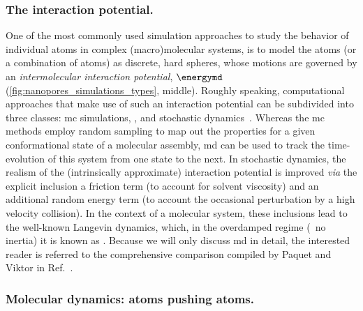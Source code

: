 \subsubsection{The interaction potential.}
%

One of the most commonly used simulation approaches to study the behavior of individual atoms in complex
(macro)molecular systems, is to model the atoms (or a combination of atoms) as discrete, hard spheres, whose
motions are governed by an \emph{intermolecular interaction potential}, $\energymd$
(\cref{fig:nanopores_simulations_types}, middle). Roughly speaking, computational approaches that make use of
such an interaction potential can be subdivided into three classes: \gls{mc} simulations, ,
and stochastic dynamics~\cite{Paquet-2015}. Whereas the \gls{mc} methods employ random sampling to map out the
properties for a given conformational state of a molecular assembly, \gls{md} can be used to track the
time-evolution of this system from one state to the next. In stochastic dynamics, the realism of the
(intrinsically approximate) interaction potential is improved \textit{via} the explicit inclusion a friction
term (to account for solvent viscosity) and an additional random energy term (to account the occasional
perturbation by a high velocity collision). In the context of a molecular system, these inclusions lead to the
well-known Langevin dynamics, which, in the overdamped regime (\ie~no inertia) it is known as .
Because we will only discuss \gls{md} in detail, the interested reader is referred to the comprehensive
comparison compiled by Paquet and Viktor in Ref.~\cite{Paquet-2015}.

\subsubsection{Molecular dynamics: atoms pushing atoms.}
%

